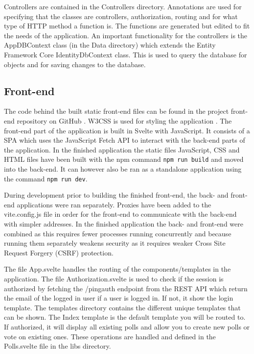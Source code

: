Controllers are contained in the Controllers directory. Annotations are used for specifying that the classes are controllers, authorization, routing and for what type of HTTP method a function is. The functions are generated but edited to fit the needs of the application. An important functionality for the controllers is the AppDBContext class (in the Data directory) which extends the Entity Framework Core IdentityDbContext class. This is used to query the database for objects and for saving changes to the database.

\subsection{Front-end}

The code behind the built static front-end files can be found in the project front-end repository on GitHub \cite{github_598975project-frontend_2024}. W3CSS is used for styling the application \cite{W3CSS}.
\newline
\newline
The front-end part of the application is built in Svelte with JavaScript. It consists of a SPA which uses the JavaScript Fetch API to interact with the back-end parts of the application. In the finished application the static files JavaScript, CSS and HTML files have been built with the npm command \verb|npm run build| and moved into the back-end. It can however also be ran as a standalone application using the command \verb|npm run dev|. 

During development prior to building the finished front-end, the back- and front-end applications were ran separately. Proxies have been added to the vite.config.js file in order for the front-end to communicate with the back-end with simpler addresses. In the finished application the back- and front-end were combined as this requires fewer processes running concurrently and because running them separately weakens security as it requires weaker Cross Site Request Forgery (CSRF) protection.

The file App.svelte handles the routing of the components/templates in the application. The file Authorization.svelte is used to check if the session is authorized by fetching the /pingauth endpoint from the REST API which return the email of the logged in user if a user is logged in. If not, it show the login template. The templates directory contains the different unique templates that can be shown. The Index template is the default template you will be routed to. If authorized, it will display all existing polls and allow you to create new polls or vote on existing ones. These operations are handled and defined in the Polls.svelte file in the libs directory.


